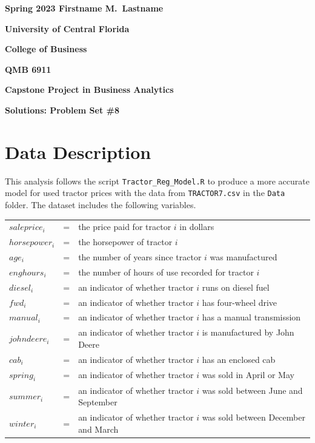 \documentclass[11pt]{paper}
\begin{document}

\pagestyle{empty}
{\noindent\bf Spring 2023 \hfill Firstname M.~Lastname}
\vskip 16pt
\centerline{\bf University of Central Florida}
\centerline{\bf College of Business}
\vskip 16pt
\centerline{\bf QMB 6911}
\centerline{\bf Capstone Project in Business Analytics}
\vskip 10pt
\centerline{\bf Solutions:  Problem Set \#8}
\vskip 32pt
\noindent
% 
\section{Data Description}

This analysis follows the script \texttt{Tractor\_Reg\_Model.R} to produce a more accurate model for used tractor prices with the data from \texttt{TRACTOR7.csv} in the \texttt{Data} folder. 
The dataset includes the following variables.
\begin{table}[h!]
\begin{tabular}{l l l}

$saleprice_i$ & = & the price paid for tractor $i$ in dollars \\
% 
$horsepower_i$ & = & the horsepower of tractor $i$ \\
$age_i$ & = & the number of years since tractor $i$ was manufactured  \\
$enghours_i$ & = & the number of hours of use recorded for tractor $i$  \\
$diesel_i$ & = & an indicator of whether tractor $i$ runs on diesel fuel \\ %
$fwd_i$ & = & an indicator of whether tractor $i$ has four-wheel drive \\ %
$manual_i$ & = & an indicator of whether tractor $i$ has a manual transmission \\ %
$johndeere_i$ & = & an indicator of whether tractor $i$ is manufactured by John Deere \\ %
$cab_i$ & = & an indicator of whether tractor $i$ has an enclosed cab \\ %
% 
$spring_i$ & = & an indicator of whether tractor $i$ was sold in April or May \\ %
$summer_i$ & = & an indicator of whether tractor $i$ was sold between June and September \\ %
$winter_i$ & = & an indicator of whether tractor $i$ was sold between December and March \\ %

\end{tabular}
\end{table}
%
\end{document}
